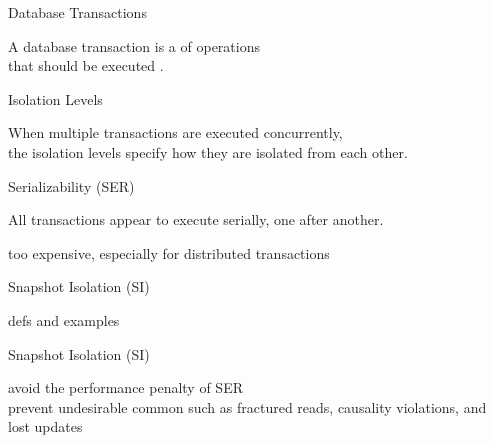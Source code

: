
\begin{frame}{Database Transactions}
  \begin{center}
    A database transaction is a  of operations \\[6pt]
    that should be executed .
  \end{center}
\end{frame}

\begin{frame}{Isolation Levels}
  \begin{center}
    When multiple transactions are executed concurrently, \\[6pt]
    the isolation levels specify how they are isolated from each other.
    \vspace{0.60cm}
  \end{center}
\end{frame}

\begin{frame}{Serializability (SER)}
  \begin{center}
    All transactions appear to execute serially, one after another.

    \vspace{0.60cm}
    too expensive, especially for distributed transactions
  \end{center}
\end{frame}

\begin{frame}{Snapshot Isolation (SI)}
  \begin{center}
    defs and examples
    \pause
    \vspace{0.60cm}
  \end{center}
\end{frame}

\begin{frame}{Snapshot Isolation (SI)}
  \begin{center}

    \pause
    \vspace{0.60cm}
    avoid the performance penalty of SER \\[6pt]
    prevent undesirable common  such as
    fractured reads, causality violations, and lost updates
  \end{center}
\end{frame}

